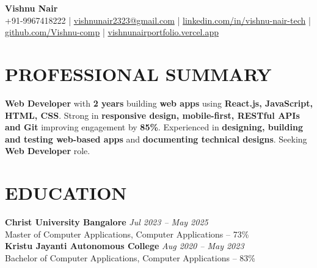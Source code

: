 \documentclass[10pt,a4paper]{article}
\begin{document}

\begin{center}

{\Large \textbf{Vishnu Nair}}\\[4pt]

{\small
+91-9967418222
\quad|\quad
\href{mailto:vishnunair2323@gmail.com}{vishnunair2323@gmail.com}
\quad|\quad
\href{https://linkedin.com/in/vishnu-nair-tech}{linkedin.com/in/vishnu-nair-tech}
\quad|\quad
\href{https://github.com/Vishnu-comp}{github.com/Vishnu-comp}
\quad|\quad
\href{https://vishnunairportfolio.vercel.app}{vishnunairportfolio.vercel.app}
}

\end{center}


\section*{PROFESSIONAL SUMMARY}

\small

\textbf{Web Developer} with \textbf{2 years} building \textbf{web apps} using \textbf{React.js, JavaScript, HTML, CSS}. Strong in \textbf{responsive design, mobile-first, RESTful APIs and Git} improving engagement by \textbf{85\%}. Experienced in \textbf{designing, building and testing web-based apps} and \textbf{documenting technical designs}. Seeking \textbf{Web Developer} role.


\section*{EDUCATION}
\small
\textbf{Christ University Bangalore} \hfill \textit{Jul 2023 -- May 2025}\\
Master of Computer Applications, Computer Applications -- 73\%\\
\small
\textbf{Kristu Jayanti Autonomous College} \hfill \textit{Aug 2020 -- May 2023}\\
Bachelor of Computer Applications, Computer Applications -- 83\%

\end{document}

